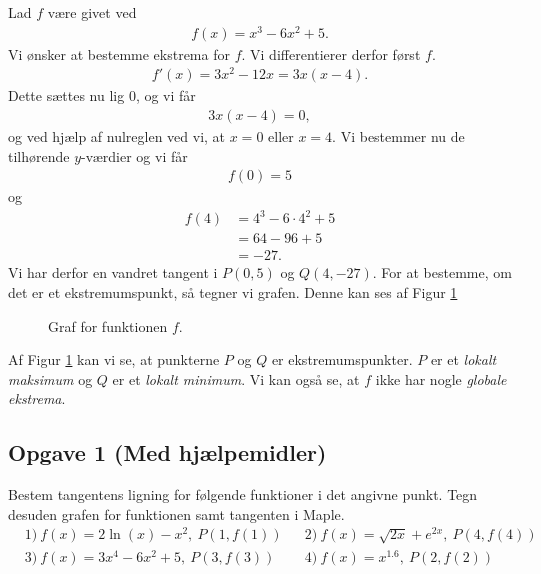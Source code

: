 \begin{exa}
	Lad $f$ være givet ved
	\begin{align*}
		f(x) = x^3-6x^2+5.
	\end{align*}
	Vi ønsker at bestemme ekstrema for $f$. Vi differentierer derfor først $f$.
	\begin{align*}
		f'(x) = 3x^2-12x = 3x(x-4).
	\end{align*}
	Dette sættes nu lig $0$, og vi får
	\begin{align*}
		3x(x-4) = 0, 
	\end{align*}
	og ved hjælp af nulreglen ved vi, at $x=0$ eller $x = 4$. Vi bestemmer nu de tilhørende $y$-værdier og vi får
	\begin{align*}
		f(0) = 5
	\end{align*}
	og 
	\begin{align*}
		f(4) &= 4^3 - 6\cdot 4^2+5\\
		&= 64-96+5\\
		&= -27.
	\end{align*}
	Vi har derfor en vandret tangent i $P(0,5)$ og $Q(4,-27)$. For at bestemme, om det er et ekstremumspunkt, så tegner vi grafen. Denne kan ses af Figur \ref{fig:ekstrema}
	\begin{figure}[H]
		\centering
		\caption{Graf for funktionen $f$.}
		\label{fig:ekstrema}
	\end{figure}
\end{exa}
Af Figur \ref{fig:ekstrema} kan vi se, at punkterne $P$ og $Q$ er ekstremumspunkter. $P$ er et \textit{lokalt maksimum} og $Q$ er et \textit{lokalt minimum}. Vi kan også se, at $f$ ikke har nogle 
\textit{globale ekstrema}.




\subsection*{Opgave 1 (Med hjælpemidler)}
Bestem tangentens ligning for følgende funktioner i det angivne punkt. Tegn desuden grafen for funktionen samt tangenten i Maple.
\begin{align*}
	&1) \ f(x) = 2\ln(x) - x^2, \ P(1,f(1)) &&2) \ f(x) = \sqrt{2x} + e^{2x}, \ P(4,f(4))\\
	&3) \ f(x) = 3x^4-6x^2+5, \ P(3,f(3)) &&4) \ f(x) = x^{1.6}, \ P(2	,f(2))\\
\end{align*}

